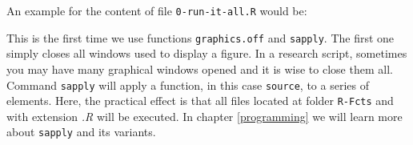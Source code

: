 \documentclass[
  12pt,
]{book}
\newenvironment{Shaded}{\begin{snugshade}}{\end{snugshade}}
\newcommand{\CommentTok}[1]{\textcolor[rgb]{0.37,0.37,0.37}{\textit{#1}}}
\newcommand{\DataTypeTok}[1]{\textcolor[rgb]{0.27,0.27,0.27}{#1}}
\newcommand{\KeywordTok}[1]{\textcolor[rgb]{0.27,0.27,0.27}{\textbf{#1}}}
\newcommand{\NormalTok}[1]{#1}
\newcommand{\OperatorTok}[1]{\textcolor[rgb]{0.43,0.43,0.43}{\textbf{#1}}}
\newcommand{\OtherTok}[1]{\textcolor[rgb]{0.37,0.37,0.37}{#1}}
\newcommand{\StringTok}[1]{\textcolor[rgb]{0.5,0.5,0.5}{#1}}
\begin{document}
An example for the content of file \texttt{0-run-it-all.R} would be:

\begin{Shaded}
\end{Shaded}

This is the first time we use functions \texttt{graphics.off} and \texttt{sapply}. The first one simply closes all windows used to display a figure. In a research script, sometimes you may have many graphical windows opened and it is wise to close them all. Command \texttt{sapply} will apply a function, in this case \texttt{source}, to a series of elements. Here, the practical effect is that all files located at folder \texttt{R-Fcts} and with extension \emph{.R} will be executed. In chapter \ref{programming} we will learn more about \texttt{sapply} and its variants.
\end{document}
